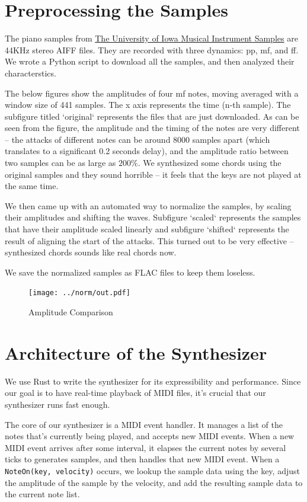 \documentclass{article}
\begin{document}
\section{Preprocessing the Samples}

The piano samples from
\href{http://theremin.music.uiowa.edu/MIS.html}
  {The University of Iowa Musical Instrument Samples} are 44KHz stereo
  AIFF files. They are recorded with three dynamics: pp, mf, and ff.
  We wrote a Python script to download all the samples, and then analyzed
  their characterstics.

The below figures show the amplitudes of four mf notes, moving averaged
with a window size of 441 samples. The x axis represents the time (n-th
sample). The subfigure
titled `original` represents the files that are just downloaded. As can be seen
from the figure, the amplitude and the timing of the notes are very
different -- the attacks of different notes can be around 8000 samples apart
(which translates to a significant 0.2 seconds delay), and the amplitude
ratio between two samples can be as large as $200\%$. 
We synthesized some chords using the original samples and they sound horrible
-- it feels that the keys are not played at the same time.

We then came up with an automated way to normalize the samples, by
scaling their amplitudes and shifting the waves. Subfigure `scaled`
represents the samples that have their amplitude scaled linearly
and subfigure `shifted` represents the result of aligning the start of
the attacks. This turned out to be very effective -- synthesized chords
sounds like real chords now.

We save the normalized samples as FLAC files to keep them loseless. 

\begin{figure}[ht]
  \centering
  \texttt{[image: ../norm/out.pdf]}
  \caption{Amplitude Comparison}
\end{figure}

\section{Architecture of the Synthesizer}

We use Rust to write the synthesizer for its expressibility and performance.
Since our goal is to have real-time playback of MIDI files, it's crucial
that our synthesizer runs fast enough.

The core of our synthesizer is a MIDI event handler. It manages a list of the
notes that's currently being played, and accepts new MIDI events. When a new MIDI
event arrives after some interval, it elapses the current notes by several
ticks to generates samples, and then handles that new MIDI event. When a
\texttt{NoteOn(key, velocity)} occurs, we lookup the sample data using the key,
adjust the amplitude of the sample by the velocity, and add the resulting
sample data to the current note list.
\end{document}
